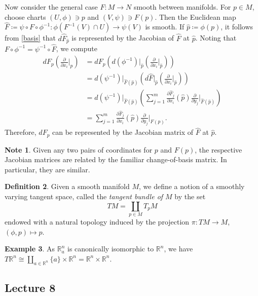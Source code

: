 \documentclass[10pt,letterpaper,cm]{nupset}
\theoremstyle{definition}
\newtheorem{definition}{Definition}[subsection]
\newtheorem{exmp}[definition]{Example}
\newtheorem{note}[definition]{Note}
\theoremstyle{theorem}
\theoremstyle{remark}
\newcommand{\R}{\mathbb R}
\newcommand{\1}{\mathbf{1}}
\newcommand{\0}{\vec 0}
\begin{document}
Now consider the general case $F: M \to N$ smooth between manifolds. For $p \in M$, choose charts $(U, \phi) \ni p$ and $(V, \psi) \ni F(p)$. Then the Euclidean map $\hat{F}\coloneqq  \psi \circ F \circ \phi^{-1} : \phi(F^{-1}(V) \cap U) \to \psi(V)$ is smooth. If $\hat{p}\coloneqq  \phi(p)$, it follows from \cref{basis} that $d\hat{F}_{\hat{p}}$ is represented by the Jacobian of $\hat{F}$ at $\hat{p}$. Noting that $F \circ \phi^{-1} = \psi^{-1} \circ \hat{F}$, we compute
\begin{align*}
dF_p\left(\frac{\partial}{\partial{x_i}}\bigr\rvert_p\right) 
 & =  dF_p\left(d(\phi^{-1})\bigr\rvert_{\hat{p}}\left(\frac{\partial}{\partial{x_i}}\bigr\rvert_{\hat{p}}\right)\right) 
\\ & = d(\psi^{-1})\bigr\rvert_{\hat{F}(\hat{p})}\left(d\hat{F}\bigr\rvert_{\hat{p}}\left(\frac{\partial}{\partial{x_i}}\bigr\rvert_{\hat{p}}\right)\right)
\\ & = d(\psi^{-1})\bigr\rvert_{\hat{F}(\hat{p})}\left(\sum_{j=1}^m \frac{\partial{\hat{F}_j}}{\partial{x_i}}(\hat{p})\frac{\partial}{\partial{y_j}}\bigr\rvert_{\hat{F}(\hat{p})}\right) 
\\ & = 
\sum_{j=1}^m \frac{\partial{\hat{F}_j}}{\partial{x_i}}(\hat{p})\frac{\partial}{\partial{y_j}}\bigr\rvert_{F(p)}.
\end{align*}
Therefore, $dF_p$ can be represented by the Jacobian matrix of $\hat{F}$ at $\hat{p}$. 

\begin{note}
Given any two pairs of coordinates for $p$ and $F(p)$, the respective Jacobian matrices are related by the familiar change-of-basis matrix. In particular, they are similar.
\end{note}

\begin{definition}
Given a smooth manifold $M$, we define a notion of a smoothly varying tangent space, called the \textit{tangent bundle of $M$} by the set  $$TM = \coprod_{p \in M} T_pM$$ endowed with a natural topology induced by the projection $\pi: TM \to M$, $(\phi, p) \mapsto p$.
\end{definition}

\begin{exmp}
As $\R_a^n$ is canonically isomorphic to $\R^n$, we have $T\R^n \cong \coprod_{a\in \R^n} \{a\} \times \R^n = \R^n \times \R^n$.
\end{exmp}

\subsection{Lecture 8}
\end{document}
